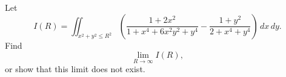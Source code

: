 Let
\[
I(R) = \iint_{x^2+y^2 \leq R^2} \left( \frac{1+2x^2}{1+x^4+6x^2y^2+y^4} - \frac{1+y^2}{2+x^4+y^4} \right)\,dx\,dy.
\]
Find
\[
\lim_{R \to \infty} I(R),
\]
or show that this limit does not exist.
